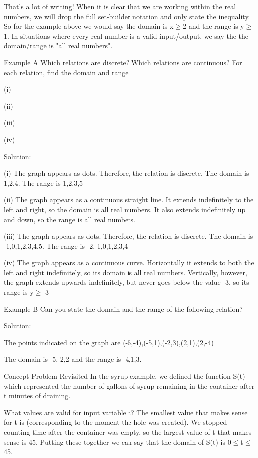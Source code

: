 \documentclass{ximera}
\begin{document}
 

That's a lot of writing! When it is clear that we are working within the real numbers, we will drop the full set-builder notation and only state the inequality. So for the example above we would say the domain is x$\ge$2 and the range is y$\ge$1. In situations where every real number is a valid input/output, we say the the domain/range is "all real numbers".

Example A
Which relations are discrete? Which relations are continuous? For each relation, find the domain and range.

(i)   

(ii)   

(iii)   

(iv)   

Solution:

(i) The graph appears as dots. Therefore, the relation is discrete. The domain is {1,2,4}. The range is {1,2,3,5}

(ii) The graph appears as a continuous straight line. It extends indefinitely to the left and right, so the domain is all real numbers. It also extends indefinitely up and down, so the range is all real numbers.

(iii) The graph appears as dots. Therefore, the relation is discrete. The domain is {-1,0,1,2,3,4,5}. The range is {-2,-1,0,1,2,3,4}

(iv) The graph appears as a continuous curve. Horizontally it extends to both the left and right indefinitely, so its domain is all real numbers. Vertically, however, the graph extends upwards indefinitely, but never goes below the value -3, so its range is y$\ge$-3 

Example B
Can you state the domain and the range of the following relation?

 

Solution:

The points indicated on the graph are {(-5,-4),(-5,1),(-2,3),(2,1),(2,-4)}

The domain is {-5,-2,2} and the range is {-4,1,3}.

Concept Problem Revisited
In the syrup example, we defined the function S(t) which represented the number of gallons of syrup remaining in the container after t minutes of draining.

What values are valid for input variable t? The smallest value that makes sense for t is  (corresponding to the moment the hole was created). We stopped counting time after the container was empty, so the largest value of t that makes sense is 45. Putting these together we can say that the domain of S(t) is 0$\le$t$\le$45.
\end{document}
